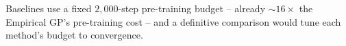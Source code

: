 
Baselines use a fixed $2{,}000$-step pre-training budget -- already $\sim\!16\times$ the
Empirical GP's pre-training cost -- and a definitive comparison would tune each method's
budget to convergence.

